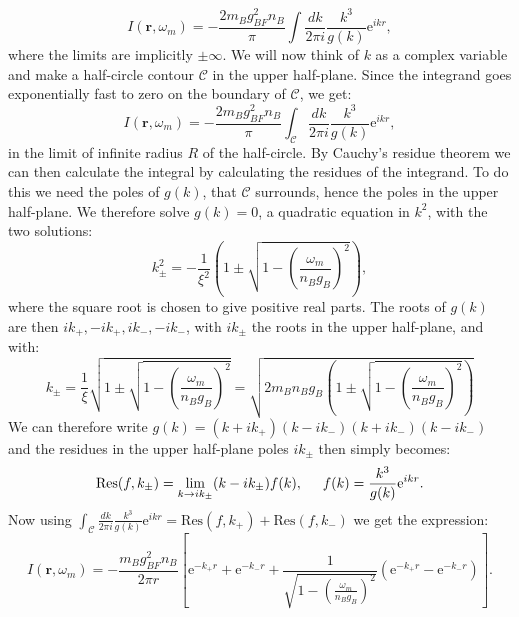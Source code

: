 \begin{equation}
I(\mathbf{r}, \omega_m) = -\frac{2m_Bg^2_{BF}n_B}{\pi}\int \frac{dk}{2\pi i} \frac{k^3}{g(k)}\text{e}^{ikr}, \nonumber
\end{equation}
where the limits are implicitly $\pm \infty$. We will now think of $k$ as a complex variable and make a half-circle contour $\mathcal{C}$ in the upper half-plane. Since the integrand goes exponentially fast to zero on the boundary of $\mathcal{C}$, we get:
\begin{equation}
I(\mathbf{r}, \omega_m) = -\frac{2m_Bg^2_{BF}n_B}{\pi}\int_{\mathcal{C}} \frac{dk}{2\pi i} \frac{k^3}{g(k)}\text{e}^{ikr}, \nonumber
\end{equation}
in the limit of infinite radius $R$ of the half-circle. By Cauchy's residue theorem we can then calculate the integral by calculating the residues of the integrand. To do this we need the poles of $g(k)$, that $\mathcal{C}$ surrounds, hence the poles in the upper half-plane. We therefore solve $g(k) = 0$, a quadratic equation in $k^2$, with the two solutions:
\begin{equation}
k^2_{\pm} = -\frac{1}{\xi^2}\left(1 \pm \sqrt{1 - \left(\frac{\omega_m}{n_Bg_B}\right)^2}\right), \nonumber
\end{equation} 
where the square root is chosen to give positive real parts. The roots of $g(k)$ are then $ik_+, -ik_+, ik_-, -ik_-$, with $ik_{\pm}$ the roots in the upper half-plane, and with: 
\begin{equation}
k_{\pm} = \frac{1}{\xi}\sqrt{1\pm \sqrt{1 - \left(\frac{\omega_m}{n_Bg_B}\right)^2}} = \sqrt{ 2m_Bn_Bg_B\left( 1 \pm \sqrt{1 - \left(\frac{\omega_m}{n_Bg_B}\right)^2 } \right) }
\label{eq.polesVindxomegam}
\end{equation}
We can therefore write $g(k) = (k + ik_+)(k - ik_-)(k + ik_-)(k - ik_-)$ and the residues in the upper half-plane poles $ik_{\pm}$ then simply becomes:
\begin{equation}
\text{Res}(f, k_{\pm}) = \lim_{k\to ik_{\pm}} (k - ik_{\pm})f(k), \hspace{0.5cm} f(k) = \frac{k^3}{g(k)}\text{e}^{ikr}. \nonumber
\end{equation}
Now using $\int_{\mathcal{C}} \frac{dk}{2\pi i} \frac{k^3}{g(k)}\text{e}^{ikr} = \text{Res}(f, k_+) + \text{Res}(f, k_-)$ we get the expression:
\begin{equation}
I(\mathbf{r}, \omega_m) = -\frac{m_Bg^2_{BF}n_B}{2\pi r}\left[ \text{e}^{-k_+r} + \text{e}^{-k_-r} + \frac{1}{ \sqrt{1 - \left(\frac{\omega_m}{n_Bg_B}\right)^2} }\left(\text{e}^{-k_+r} - \text{e}^{-k_-r}  \right) \right]. \nonumber
\end{equation}
